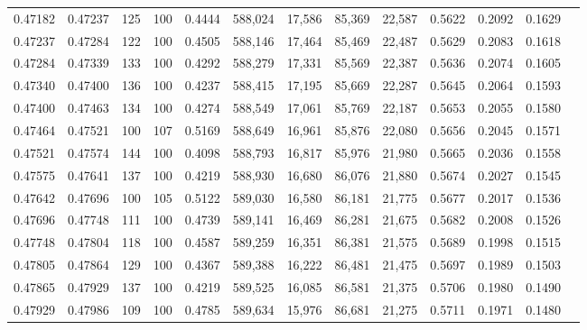 \begin{tabular}{rrrrrrrrrrrrr}
0.47182 & 0.47237 &   125 & 100 &                                     0.4444 & 588,024 &  17,586 &  85,369 &  22,587 & 0.5622 & 0.2092 & 0.1629 \\
0.47237 & 0.47284 &   122 & 100 &                                     0.4505 & 588,146 &  17,464 &  85,469 &  22,487 & 0.5629 & 0.2083 & 0.1618 \\
0.47284 & 0.47339 &   133 & 100 &                                     0.4292 & 588,279 &  17,331 &  85,569 &  22,387 & 0.5636 & 0.2074 & 0.1605 \\
0.47340 & 0.47400 &   136 & 100 &                                     0.4237 & 588,415 &  17,195 &  85,669 &  22,287 & 0.5645 & 0.2064 & 0.1593 \\
0.47400 & 0.47463 &   134 & 100 &                                     0.4274 & 588,549 &  17,061 &  85,769 &  22,187 & 0.5653 & 0.2055 & 0.1580 \\
0.47464 & 0.47521 &   100 & 107 &                                     0.5169 & 588,649 &  16,961 &  85,876 &  22,080 & 0.5656 & 0.2045 & 0.1571 \\
0.47521 & 0.47574 &   144 & 100 &                                     0.4098 & 588,793 &  16,817 &  85,976 &  21,980 & 0.5665 & 0.2036 & 0.1558 \\
0.47575 & 0.47641 &   137 & 100 &                                     0.4219 & 588,930 &  16,680 &  86,076 &  21,880 & 0.5674 & 0.2027 & 0.1545 \\
0.47642 & 0.47696 &   100 & 105 &                                     0.5122 & 589,030 &  16,580 &  86,181 &  21,775 & 0.5677 & 0.2017 & 0.1536 \\
0.47696 & 0.47748 &   111 & 100 &                                     0.4739 & 589,141 &  16,469 &  86,281 &  21,675 & 0.5682 & 0.2008 & 0.1526 \\
0.47748 & 0.47804 &   118 & 100 &                                     0.4587 & 589,259 &  16,351 &  86,381 &  21,575 & 0.5689 & 0.1998 & 0.1515 \\
0.47805 & 0.47864 &   129 & 100 &                                     0.4367 & 589,388 &  16,222 &  86,481 &  21,475 & 0.5697 & 0.1989 & 0.1503 \\
0.47865 & 0.47929 &   137 & 100 &                                     0.4219 & 589,525 &  16,085 &  86,581 &  21,375 & 0.5706 & 0.1980 & 0.1490 \\
0.47929 & 0.47986 &   109 & 100 &                                     0.4785 & 589,634 &  15,976 &  86,681 &  21,275 & 0.5711 & 0.1971 & 0.1480 \\

\end{tabular}
